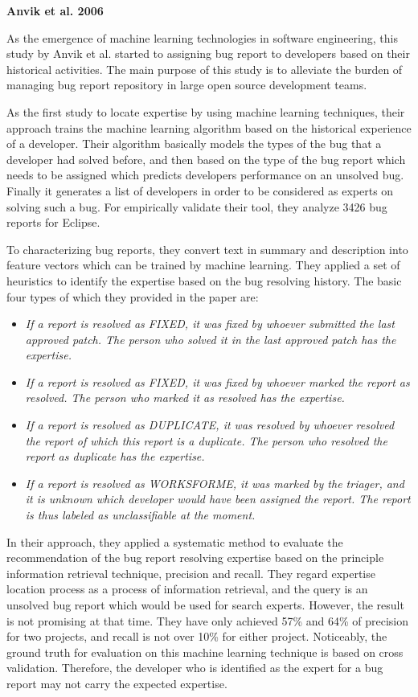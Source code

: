 \textbf{Anvik et al. 2006}

As the emergence of machine learning technologies in software engineering, this study by Anvik et al. started to assigning bug report to developers based on their historical activities. The main purpose of this study is to alleviate the burden of managing bug report repository in large open source development teams.

As the first study to locate expertise by using machine learning techniques, their approach trains the machine learning algorithm based on the historical experience of a developer. Their algorithm basically models the types of the bug that a developer had solved before, and then based on the type of the bug report which needs to be assigned which predicts developers performance on an unsolved bug. Finally it generates a list of developers in order to be considered as experts on solving such a bug. For empirically validate their tool, they analyze 3426 bug reports for Eclipse.

To characterizing bug reports, they convert text in summary and description into feature vectors which can be trained by machine learning. They applied a set of heuristics to identify the expertise based on the bug resolving history. The basic four types of which they provided in the paper are:

\begin{itemize}
\item \textit{If a report is resolved as FIXED, it was fixed by whoever submitted the last approved patch. The person who solved it in the last approved patch has the expertise.}

\item \textit{If a report is resolved as FIXED, it was fixed by whoever marked the report as resolved. The person who marked it as resolved has the expertise.}

\item \textit{If a report is resolved as DUPLICATE, it was resolved by whoever resolved the report of which this report is a duplicate. The person who resolved the report as duplicate has the expertise.}

\item \textit{If a report is resolved as WORKSFORME, it was marked by the triager, and it is unknown which developer would have been assigned the report. The report is thus labeled as unclassifiable at the moment.}
\end{itemize}

In their approach, they applied a systematic method to evaluate the recommendation of the bug report resolving expertise based on the principle information retrieval technique, precision and recall. They regard expertise location process as a process of information retrieval, and the query is an unsolved bug report which would be used for search experts. However, the result is not promising at that time. They have only achieved 57\% and 64\% of precision for two projects, and recall is not over 10\% for either project. Noticeably, the ground truth for evaluation on this machine learning technique is based on cross validation. Therefore, the developer who is identified as the expert for a bug report may not carry the expected expertise.

